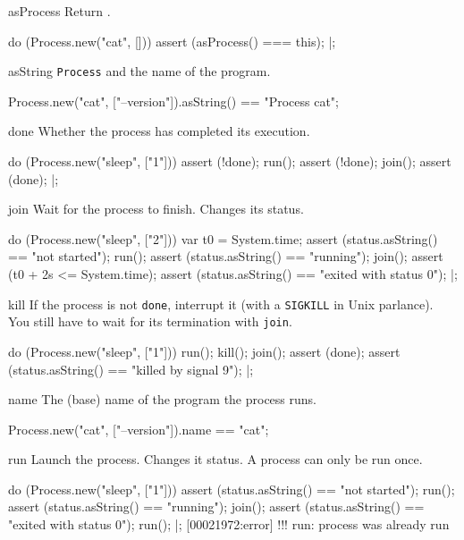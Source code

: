 \begin{urbiscriptapi}
\item[asProcess] Return \this.
\begin{urbiscript}
do (Process.new("cat", []))
{
  assert (asProcess() === this);
}|;
\end{urbiscript}


\item[asString] \lstinline|Process| and the name of the program.
\begin{urbiassert}
Process.new("cat", ["--version"]).asString()
  == "Process cat";
\end{urbiassert}


\item[done] Whether the process has completed its execution.
\begin{urbiscript}
do (Process.new("sleep", ["1"]))
{
  assert (!done);
  run();
  assert (!done);
  join();
  assert (done);
}|;
\end{urbiscript}


\item[join] Wait for the process to finish.  Changes its status.
\begin{urbiscript}
do (Process.new("sleep", ["2"]))
{
  var t0 = System.time;
  assert (status.asString() == "not started");
  run();
  assert (status.asString() == "running");
  join();
  assert (t0 + 2s <= System.time);
  assert (status.asString() == "exited with status 0");
}|;
\end{urbiscript}


\item[kill] If the process is not \lstinline|done|, interrupt it (with
  a \lstinline|SIGKILL| in Unix parlance).  You still have to wait for
  its termination with \lstinline|join|.
\begin{urbiscript}
do (Process.new("sleep", ["1"]))
{
  run();
  kill();
  join();
  assert (done);
  assert (status.asString() == "killed by signal 9");
}|;
\end{urbiscript}


\item[name] The (base) name of the program the process runs.
\begin{urbiassert}
Process.new("cat", ["--version"]).name == "cat";
\end{urbiassert}


\item[run] Launch the process.  Changes it status.  A process can only
  be run once.
\begin{urbiscript}
do (Process.new("sleep", ["1"]))
{
  assert (status.asString() == "not started");
  run();
  assert (status.asString() == "running");
  join();
  assert (status.asString() == "exited with status 0");
  run();
}|;
[00021972:error] !!! run: process was already run
\end{urbiscript}



\end{urbiscriptapi}
